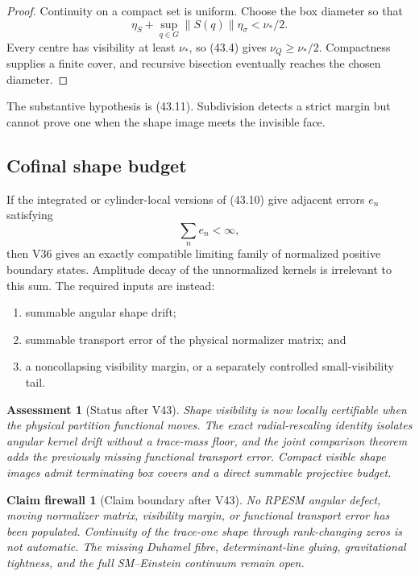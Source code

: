 \documentclass[11pt]{article}
\newtheorem{firewall}[theorem]{Claim firewall}
\newtheorem{assessment}[theorem]{Assessment}
\theoremstyle{remark}
\begin{document}
\begin{proof}
Continuity on a compact set is uniform.  Choose the box diameter so
that
\[
 \eta_S+\sup_{q\in G}\|S(q)\|\eta_\sigma<\nu_*/2.
\]
Every centre has visibility at least \(\nu_*\), so (43.4) gives
\(\nu_Q\geq\nu_*/2\).  Compactness supplies a finite cover, and
recursive bisection eventually reaches the chosen diameter.
\end{proof}

The substantive hypothesis is (43.11).  Subdivision detects a strict
margin but cannot prove one when the shape image meets the invisible
face.

\subsection{Cofinal shape budget}

If the integrated or cylinder-local versions of (43.10) give
adjacent errors \(e_n\) satisfying
\[
                         \sum_ne_n<\infty,        \tag{43.12}
\]
then V36 gives an exactly compatible limiting family of normalized
positive boundary states.  Amplitude decay of the unnormalized
kernels is irrelevant to this sum.  The required inputs are instead:
\begin{enumerate}
\item summable angular shape drift;
\item summable transport error of the physical normalizer matrix; and
\item a noncollapsing visibility margin, or a separately controlled
small-visibility tail.
\end{enumerate}

\begin{assessment}[Status after V43]
\label{ass:v12v43-status}
Shape visibility is now locally certifiable when the physical
partition functional moves.  The exact radial-rescaling identity
isolates angular kernel drift without a trace-mass floor, and the
joint comparison theorem adds the previously missing functional
transport error.  Compact visible shape images admit terminating
box covers and a direct summable projective budget.
\end{assessment}

\begin{firewall}[Claim boundary after V43]
\label{fire:v12v43-claim}
No RPESM angular defect, moving normalizer matrix, visibility margin,
or functional transport error has been populated.  Continuity of
the trace-one shape through rank-changing zeros is not automatic.
The missing Duhamel fibre, determinant-line gluing, gravitational
tightness, and the full SM--Einstein continuum remain open.
\end{firewall}
\end{document}
